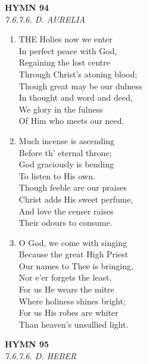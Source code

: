 \documentclass[11pt,a4paper]{article}
\begin{document}
\newpage
\begin{center}
    {\Large \textbf{HYMN 94\textdagger{}}}
    \\
    \textit{7.6.7.6. D. AURELIA}
\end{center}
\vspace{1em}

\begin{enumerate}
    \item THE Holies now we enter \\
        In perfect peace with God, \\
        Regaining the lost centre \\
        Through Christ's atoning blood; \\
        Though great may be our dulness \\
        In thought and word and deed, \\
        We glory in the fulness \\
        Of Him who meets our need.

    \item Much incense is ascending \\
        Before th' eternal throne; \\
        God graciously is bending \\
        To listen to His own. \\
        Though feeble are our praises \\
        Christ adds His sweet perfume, \\
        And love the censer raises \\
        Their odours to consume.

    \item O God, we come with singing \\
        Because the great High Priest \\
        Our names to Thee is bringing, \\
        Nor e'er forgets the least. \\
        For us He wears the mitre \\
        Where holiness shines bright; \\
        For us His robes are whiter \\
        Than heaven's unsullied light.

\end{enumerate}

\newpage
\begin{center}
    {\Large \textbf{HYMN 95\textdagger{}}}
    \\
    \textit{7.6.7.6. D. HEBER}
\end{center}
\vspace{1em}
\end{document}
